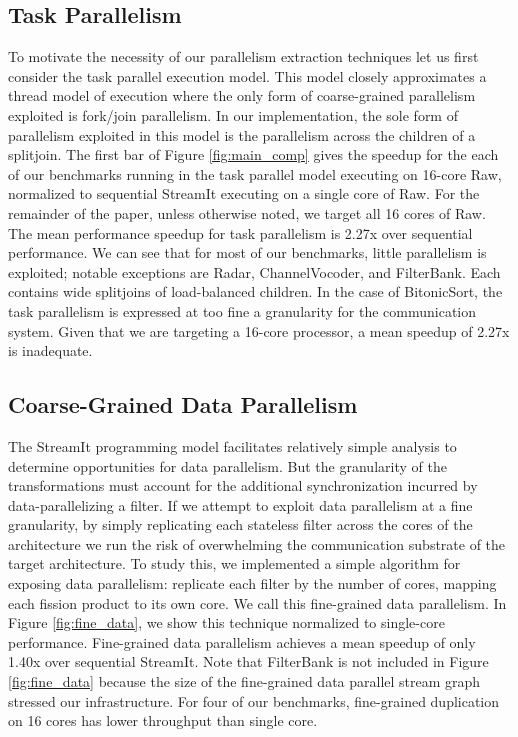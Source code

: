 \subsection{Task Parallelism}
To motivate the necessity of our parallelism extraction techniques let
us first consider the task parallel execution model.  This model
closely approximates a thread model of execution where the only form
of coarse-grained parallelism exploited is fork/join parallelism.  In
our implementation, the sole form of parallelism exploited in this
model is the parallelism across the children of a splitjoin. The first
bar of Figure \ref{fig:main_comp} gives the speedup for the
each of our benchmarks running in the task parallel model executing on
16-core Raw, normalized to sequential StreamIt executing on a single
core of Raw.  For the remainder of the paper, unless otherwise noted,
we target all 16 cores of Raw.  The mean performance speedup for task
parallelism is 2.27x over sequential performance. We can see that for
most of our benchmarks, little parallelism is exploited; notable
exceptions are Radar, ChannelVocoder, and FilterBank.  Each contains
wide splitjoins of load-balanced children.  In the case of
BitonicSort, the task parallelism is expressed at too fine a
granularity for the communication system.  Given that we are targeting
a 16-core processor, a mean speedup of 2.27x is inadequate.

\subsection{Coarse-Grained Data Parallelism}

The StreamIt programming model facilitates relatively simple analysis
to determine opportunities for data parallelism.  But the granularity
of the transformations must account for the additional synchronization
incurred by data-parallelizing a filter.  If we attempt to exploit
data parallelism at a fine granularity, by simply replicating each
stateless filter across the cores of the architecture we run the risk
of overwhelming the communication substrate of the target
architecture.  To study this, we implemented a simple algorithm for
exposing data parallelism: replicate each filter by the number of
cores, mapping each fission product to its own core.  We call this
fine-grained data parallelism.  In Figure \ref{fig:fine_data}, we show
this technique normalized to single-core performance.  Fine-grained
data parallelism achieves a mean speedup of only 1.40x over sequential
StreamIt.  Note that FilterBank is not included in Figure
\ref{fig:fine_data} because the size of the fine-grained data parallel
stream graph stressed our infrastructure.  For four of our benchmarks,
fine-grained duplication on 16 cores has lower throughput than
single core.

